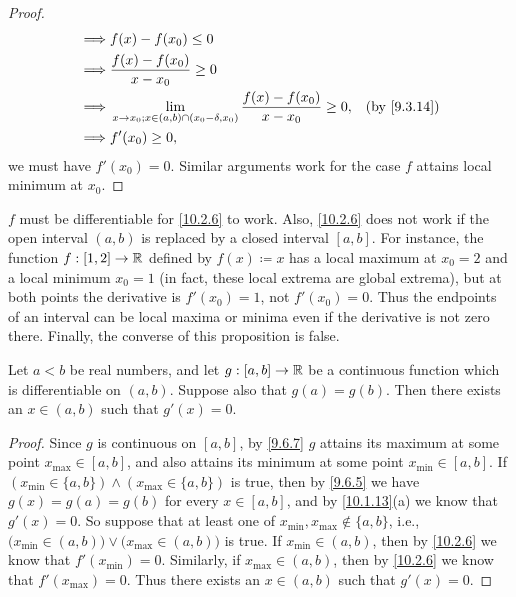 \begin{proof}
\begin{align*}
    \implies & f(x) - f(x_0) \leq 0                                                                                                       \\
    \implies & \frac{f(x) - f(x_0)}{x - x_0} \geq 0                                                                                       \\
    \implies & \lim_{x \to x_0 ; x \in (a, b) \cap (x_0 - \delta, x_0)} \frac{f(x) - f(x_0)}{x - x_0} \geq 0, & \text{(by \cref{9.3.14})} \\
    \implies & f'(x_0) \geq 0,
  \end{align*}
  we must have \(f'(x_0) = 0\).
  Similar arguments work for the case \(f\) attains local minimum at \(x_0\).
\end{proof}

\begin{note}
  \(f\) must be differentiable for \cref{10.2.6} to work.
  Also, \cref{10.2.6} does not work if the open interval \((a, b)\) is replaced by a closed interval \([a, b]\).
  For instance, the function \(f : [1, 2] \to \mathbb{R}\) defined by \(f(x) \coloneqq x\) has a local maximum at \(x_0 = 2\) and a local minimum \(x_0 = 1\) (in fact, these local extrema are global extrema), but at both points the derivative is \(f'(x_0) = 1\), not \(f'(x_0) = 0\).
  Thus the endpoints of an interval can be local maxima or minima even if the derivative is not zero there.
  Finally, the converse of this proposition is false.
\end{note}

\begin{thm}\label{10.2.7}
  Let \(a < b\) be real numbers, and let \(g : [a, b] \to \mathbb{R}\) be a continuous function which is differentiable on \((a, b)\).
  Suppose also that \(g(a) = g(b)\).
  Then there exists an \(x \in (a, b)\) such that \(g'(x) = 0\).
\end{thm}

\begin{proof}
  Since \(g\) is continuous on \([a, b]\), by \cref{9.6.7} \(g\) attains its maximum at some point \(x_{\max} \in [a, b]\), and also attains its minimum at some point \(x_{\min} \in [a, b]\).
  If \((x_{\min} \in \{a, b\}) \land (x_{\max} \in \{a, b\})\) is true, then by \cref{9.6.5} we have \(g(x) = g(a) = g(b)\) for every \(x \in [a, b]\), and by \cref{10.1.13}(a) we know that \(g'(x) = 0\).
  So suppose that at least one of \(x_{\min}, x_{\max} \notin \{a, b\}\), i.e., \(\big(x_{\min} \in (a, b)\big) \lor \big(x_{\max} \in (a, b)\big)\) is true.
  If \(x_{\min} \in (a, b)\), then by \cref{10.2.6} we know that \(f'(x_{\min}) = 0\).
  Similarly, if \(x_{\max} \in (a, b)\), then by \cref{10.2.6} we know that \(f'(x_{\max}) = 0\).
  Thus there exists an \(x \in (a, b)\) such that \(g'(x) = 0\).
\end{proof}

